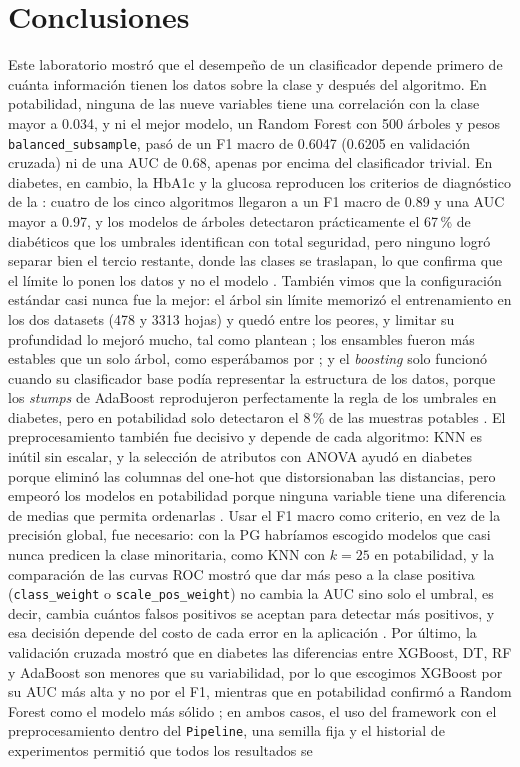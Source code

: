 \documentclass[11pt,a4paper]{article}
\let\citepOriginal\citep
\renewcommand*{\citep}[1]{\textbf{\citepOriginal{#1}}}%
\let\citetOriginal\citet
\renewcommand*{\citet}[1]{\textbf{\citetOriginal{#1}}}%
\begin{document}
\section{Conclusiones}

Este laboratorio mostró que el desempeño de un clasificador depende primero de cuánta información tienen los datos sobre la clase y después del algoritmo. En potabilidad, ninguna de las nueve variables tiene una correlación con la clase mayor a 0.034, y ni el mejor modelo, un Random Forest con 500 árboles y pesos \texttt{balanced\_subsample}, pasó de un F1 macro de 0.6047 (0.6205 en validación cruzada) ni de una AUC de 0.68, apenas por encima del clasificador trivial. En diabetes, en cambio, la HbA1c y la glucosa reproducen los criterios de diagnóstico de la \citet{ada2024}: cuatro de los cinco algoritmos llegaron a un F1 macro de 0.89 y una AUC mayor a 0.97, y los modelos de árboles detectaron prácticamente el 67\,\% de diabéticos que los umbrales identifican con total seguridad, pero ninguno logró separar bien el tercio restante, donde las clases se traslapan, lo que confirma que el límite lo ponen los datos y no el modelo \citep{he2009}. También vimos que la configuración estándar casi nunca fue la mejor: el árbol sin límite memorizó el entrenamiento en los dos datasets (478 y 3313 hojas) y quedó entre los peores, y limitar su profundidad lo mejoró mucho, tal como plantean \citet{breiman1984}; los ensambles fueron más estables que un solo árbol, como esperábamos por \citet{breiman2001}; y el \textit{boosting} solo funcionó cuando su clasificador base podía representar la estructura de los datos, porque los \textit{stumps} de AdaBoost reprodujeron perfectamente la regla de los umbrales en diabetes, pero en potabilidad solo detectaron el 8\,\% de las muestras potables \citep{freund1997}. El preprocesamiento también fue decisivo y depende de cada algoritmo: KNN es inútil sin escalar, y la selección de atributos con ANOVA ayudó en diabetes porque eliminó las columnas del one-hot que distorsionaban las distancias, pero empeoró los modelos en potabilidad porque ninguna variable tiene una diferencia de medias que permita ordenarlas \citep{guyon2003}. Usar el F1 macro como criterio, en vez de la precisión global, fue necesario: con la PG habríamos escogido modelos que casi nunca predicen la clase minoritaria, como KNN con $k=25$ en potabilidad, y la comparación de las curvas ROC mostró que dar más peso a la clase positiva (\texttt{class\_weight} o \texttt{scale\_pos\_weight}) no cambia la AUC sino solo el umbral, es decir, cambia cuántos falsos positivos se aceptan para detectar más positivos, y esa decisión depende del costo de cada error en la aplicación \citep{fawcett2006,sokolova2009}. Por último, la validación cruzada mostró que en diabetes las diferencias entre XGBoost, DT, RF y AdaBoost son menores que su variabilidad, por lo que escogimos XGBoost por su AUC más alta y no por el F1, mientras que en potabilidad confirmó a Random Forest como el modelo más sólido \citep{kohavi1995}; en ambos casos, el uso del framework con el preprocesamiento dentro del \texttt{Pipeline}, una semilla fija y el historial de experimentos permitió que todos los resultados se 
\end{document}
